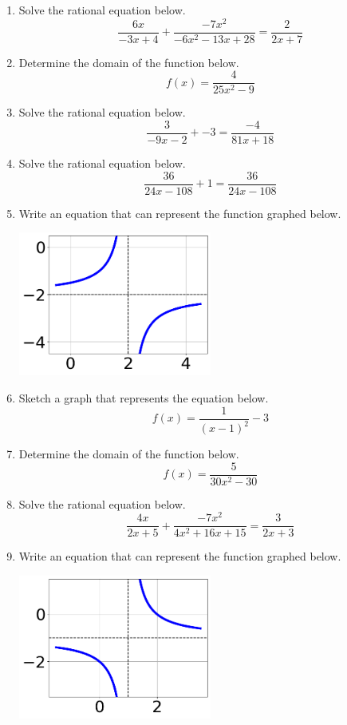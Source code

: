 \documentclass[14pt]{extbook}
\begin{document}
\begin{enumerate}
\item{
Solve the rational equation below.\[ \frac{6x}{-3x + 4} + \frac{-7x^{2}}{-6x^{2} -13 x + 28} = \frac{2}{2x + 7} \]} \newpage
\item{
Determine the domain of the function below.\[ f(x) = \frac{4}{25x^{2} -9} \]} \newpage
\item{
Solve the rational equation below.\[ \frac{3}{-9x -2} + -3 = \frac{-4}{81x + 18} \]} \newpage
\item{
Solve the rational equation below.\[ \frac{36}{24x -108} + 1 = \frac{36}{24x -108} \]} \newpage
\item{
Write an equation that can represent the function graphed below.
\begin{center}
    \includegraphics[width=0.5\textwidth]{../Figures/rationalGraphToEquationA.png}
\end{center}
} \newpage
\item{
Sketch a graph that represents the equation below.\[ f(x) = \frac{1}{(x - 1)^2} - 3 \]} \newpage
\item{
Determine the domain of the function below.\[ f(x) = \frac{5}{30x^{2} -30} \]} \newpage
\item{
Solve the rational equation below.\[ \frac{4x}{2x + 5} + \frac{-7x^{2}}{4x^{2} +16 x + 15} = \frac{3}{2x + 3} \]} \newpage
\item{
Write an equation that can represent the function graphed below.
\begin{center}
    \includegraphics[width=0.5\textwidth]{../Figures/rationalGraphToEquationCopyA.png}

\end{center}}
\end{enumerate}
\end{document}

